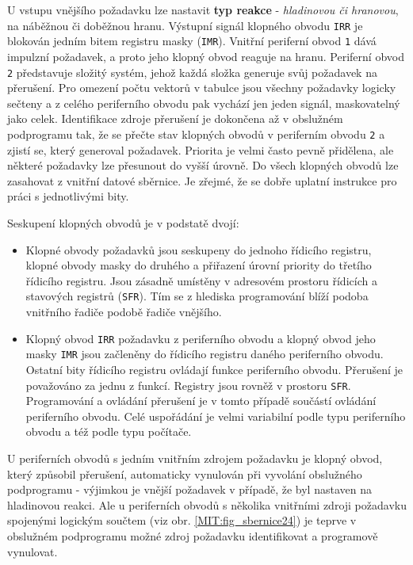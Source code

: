       U vstupu vnějšího požadavku lze nastavit \textbf{typ reakce} - \emph{hladinovou či hranovou}, 
      na náběžnou či doběžnou hranu. Výstupní signál klopného obvodu \texttt{IRR} je blokován 
      jedním bitem registru masky (\texttt{IMR}). Vnitřní periferní obvod \texttt{1} dává impulzní 
      požadavek, a proto jeho klopný obvod reaguje na hranu. Periferní obvod \texttt{2} představuje 
      složitý systém, jehož každá složka generuje svůj požadavek na přerušení. Pro omezení počtu 
      vektorů v tabulce jsou všechny požadavky logicky sečteny a z celého periferního obvodu pak 
      vychází jen jeden signál, maskovatelný jako celek. Identifikace zdroje přerušení je dokončena 
      až v obslužném podprogramu tak, že se přečte stav klopných obvodů v periferním obvodu 
      \texttt{2} a zjistí se, který generoval požadavek. Priorita je velmi často pevně přidělena, 
      ale některé požadavky lze přesunout do vyšší úrovně. Do všech klopných obvodů lze zasahovat z 
      vnitřní datové sběrnice. Je zřejmé, že se dobře uplatní instrukce pro práci s jednotlivými 
      bity.
        
      Seskupení klopných obvodů je v podstatě dvojí:
      \begin{itemize}\addtolength{\itemsep}{-0.5\baselineskip}
        \item Klopné obvody požadavků jsou seskupeny do jednoho řídicího registru, klopné obvody    
              masky do druhého a přiřazení úrovní priority do třetího řídicího registru. Jsou 
              zásadně umístěny v adresovém prostoru řídicích a stavových registrů (\texttt{SFR}). 
              Tím se z hlediska programování blíží podoba vnitřního řadiče podobě řadiče vnějšího.
        \item Klopný obvod \texttt{IRR} požadavku z periferního obvodu a klopný obvod jeho masky    
              \texttt{IMR} jsou začleněny do řídicího registru daného periferního obvodu. Ostatní 
              bity řídicího registru ovládají funkce periferního obvodu. Přerušení je považováno za 
              jednu z funkcí. Registry jsou rovněž v prostoru \texttt{SFR}. Programování a ovládání 
              přerušení je v tomto případě součástí ovládání periferního obvodu. Celé uspořádání je 
              velmi variabilní podle typu periferního obvodu a též podle 
        typu počítače.
      \end{itemize}

      U periferních obvodů s jedním vnitřním zdrojem požadavku je klopný obvod, který způsobil 
      přerušení, automaticky vynulován při vyvolání obslužného podprogramu - výjimkou je vnější 
      požadavek v případě, že byl nastaven na hladinovou reakci. Ale u periferních obvodů s 
      několika vnitřními zdroji požadavku spojenými logickým součtem (viz obr. 
      \ref{MIT:fig_sbernice24}) je teprve v obslužném podprogramu možné zdroj požadavku 
      identifikovat a programově vynulovat.
      
